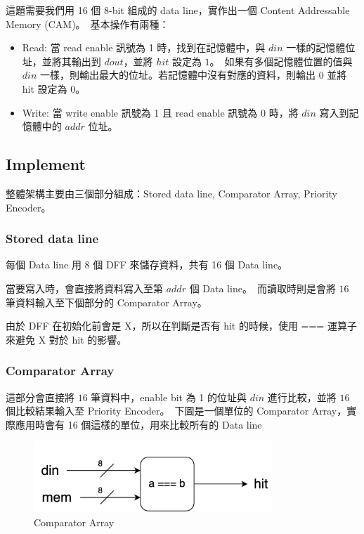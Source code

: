 \documentclass[10.5pt,compsoc,UTF8]{CjC}
\theoremstyle{mystyle}
\begin{document}
這題需要我們用 16 個 8-bit 組成的 data line，實作出一個 Content Addressable Memory (CAM)。\
基本操作有兩種：

\begin{itemize}
  \item Read: 當 read enable 訊號為 1 時，找到在記憶體中，與 $din$ 一樣的記憶體位址，並將其輸出到 $dout$，並將 $hit$ 設定為 $1$。\
  如果有多個記憶體位置的值與 $din$ 一樣，則輸出最大的位址。若記憶體中沒有對應的資料，則輸出 $0$ 並將 hit 設定為 $0$。
  \item Write: 當 write enable 訊號為 1 且 read enable 訊號為 0 時，將 $din$ 寫入到記憶體中的 $addr$ 位址。
\end{itemize}

\subsection{Implement}
整體架構主要由三個部分組成：Stored data line, Comparator Array, Priority Encoder。

\subsubsection*{Stored data line}
每個 Data line 用 8 個 DFF 來儲存資料，共有 16 個 Data line。
\par
當要寫入時，會直接將資料寫入至第 $addr$ 個 Data line。\
而讀取時則是會將 $16$ 筆資料輸入至下個部分的 Comparator Array。
\par
由於 DFF 在初始化前會是 X，所以在判斷是否有 hit 的時候，使用 === 運算子來避免 X 對於 hit 的影響。

\subsubsection*{Comparator Array}
這部分會直接將 $16$ 筆資料中，enable bit 為 1 的位址與 $din$ 進行比較，並將 $16$ 個比較結果輸入至 Priority Encoder。\
下圖是一個單位的 Comparator Array，實際應用時會有 16 個這樣的單位，用來比較所有的 Data line

\begin{figure}[h!]
  \centering
  \includegraphics[width=0.8\textwidth]{./img/Q1-CA.png}
  \caption{Comparator Array}
  \label{fig:CA}
\end{figure}
\end{document}
